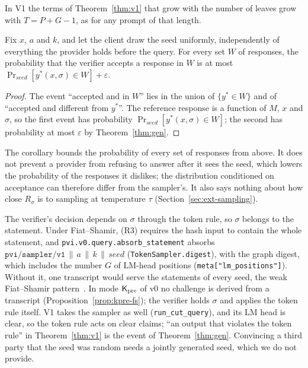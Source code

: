 \noindent In V1 the terms of Theorem~\ref{thm:v1} that grow with the number of leaves grow with
$T=P+G-1$, as for any prompt of that length.

\begin{corollary}
\label{cor:seed}
Fix $x$, $a$ and $k$, and let the client draw the seed uniformly, independently of everything the
provider holds before the query. For every set $W$ of responses, the probability that the verifier
accepts a response in $W$ is at most $\Pr_{\mathit{seed}}[y^\ast(x,\sigma)\in W]+\varepsilon$.
\end{corollary}

\begin{proof}
The event ``accepted and in $W$'' lies in the union of $\{y^\ast\in W\}$ and of ``accepted and
different from $y^\ast$''. The reference response is a function of $M$, $x$ and $\sigma$, so the
first event has probability $\Pr_{\mathit{seed}}[y^\ast(x,\sigma)\in W]$; the second has probability
at most $\varepsilon$ by Theorem~\ref{thm:gen}.
\end{proof}

\noindent The corollary bounds the probability of every set of responses from above. It does not
prevent a provider from refusing to answer after it sees the seed, which lowers the probability of
the responses it dislikes; the distribution conditioned on acceptance can therefore differ from the
sampler's. It also says nothing about how close $R_\sigma$ is to sampling at temperature $\tau$
(Section~\ref{sec:ext-sampling}).

 The verifier's decision depends on $\sigma$ through the
token rule, so $\sigma$ belongs to the statement. Under Fiat--Shamir, (R3) requires the hash input to
contain the whole statement, and \texttt{pvi.v0.query.absorb\_statement} absorbs
$\texttt{pvi/sampler/v1}\,\|\,a\,\|\,k\,\|\,\mathit{seed}$ (\texttt{TokenSampler.digest}), with the
graph digest, which includes the number $G$ of LM-head positions (\texttt{meta["lm\_positions"]}).
Without it, one transcript would serve the statements of every seed, the weak Fiat--Shamir
pattern~\cite{bernhard2012pitfalls,dao2023weakfs}. In mode $\mathsf{K}_{\mathrm{pre}}$ of v0 no challenge is derived
from a transcript (Proposition~\ref{prop:kpre-fs}); the verifier holds $\sigma$ and applies the
token rule itself. V1 takes the sampler as well (\texttt{run\_cut\_query}), and its LM head is
clear, so the token rule acts on clear claims; ``an output that violates the token rule'' in
Theorem~\ref{thm:v1} is the event of Theorem~\ref{thm:gen}. Convincing a third party that the seed
was random needs a jointly generated seed, which we do not provide.

